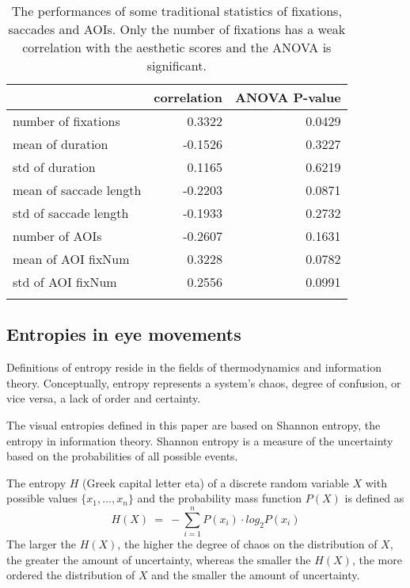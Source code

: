 \begin{table}[H]
  \centering
  \begin{tabular}{lrr}
     &correlation & ANOVA P-value \\
    \hline
    number of fixations & 0.3322 & 0.0429 \\
    mean of duration & -0.1526 & 0.3227 \\
    std of duration & 0.1165 & 0.6219 \\
    mean of saccade length & -0.2203 & 0.0871 \\
    std of saccade length & -0.1933 & 0.2732 \\
    number of AOIs & -0.2607 & 0.1631 \\
    mean of AOI fixNum & 0.3228 & 0.0782 \\
    std of AOI fixNum & 0.2556 & 0.0991 \\
    \\
  \end{tabular}
  \caption{The performances of some traditional statistics of fixations, saccades and AOIs. Only the number of fixations has a weak correlation with the aesthetic scores and the ANOVA is significant.}
  \label{tab:traditional}
\end{table}

\subsection{Entropies in eye movements}
Definitions of entropy reside in the fields of thermodynamics and information theory. Conceptually, entropy represents a system's chaos, degree of confusion, or vice versa, a lack of order and certainty.

The visual entropies defined in this paper are based on Shannon entropy, the entropy in information theory. Shannon entropy is a measure of the uncertainty based on the probabilities of all possible events.

The entropy $H$ (Greek capital letter eta) of a discrete random variable $X$ with possible values $\{x_1, ..., x_n\}$ and the probability mass function $P(X)$ is defined as
$$H(X)~=~-\sum_{i=1}^n P(x_i)\cdot log_{2}P(x_i)$$
The larger the $H(X)$, the higher the degree of chaos on the distribution of $X$, the greater the amount of uncertainty, whereas the smaller the $H(X)$, the more ordered the distribution of $X$ and the smaller the amount of uncertainty.

